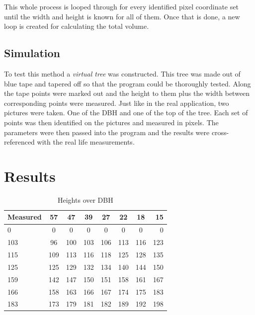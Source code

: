 This whole process is looped through for every identified pixel coordinate set until the width and height is known for all of them. Once that is done, a new loop is created for calculating the total volume.

\subsection{Simulation}
To test this method a \emph{virtual tree} was constructed. This tree was made out of blue tape and tapered off so that the program could be thoroughly tested. Along the tape points were marked out and the height to them plus the width between corresponding points were measured. Just like in the real application, two pictures were taken. One of the DBH and one of the top of the tree. Each set of points was then identified on the pictures and measured in pixels. The parameters were then passed into the program and the results were cross-referenced with the real life measurements.

\newpage

\section{Results}
\begin{table}[h!]
	\begin{center}
		\begin{tabular}{| l c c c c c c r |}		
		\hline
		Measured & 57\degree & 47\degree & 39\degree & 27\degree & 22\degree & 18\degree & 15\degree \\
		\hline
		0 		& 0 	& 0 	& 0 	& 0 	& 0 	& 0 	& 0 	\\
		103 	& 96 	& 100 	& 103 	& 106 	& 113 	& 116 	& 123 	\\
		115 	& 109 	& 113 	& 116 	& 118 	& 125 	& 128 	& 135 	\\
		125 	& 125 	& 129	& 132 	& 134 	& 140 	& 144 	& 150 	\\
		159 	& 142 	& 147 	& 150 	& 151 	& 158 	& 161 	& 167 	\\
		166 	& 158 	& 163 	& 166 	& 167 	& 174 	& 175 	& 183 	\\
		183 	& 173 	& 179 	& 181	& 182 	& 189 	& 192 	& 198 	\\
		\hline
		\end{tabular}
		\caption{Heights over DBH}
		\label{heights}
	\end{center}
\end{table}

